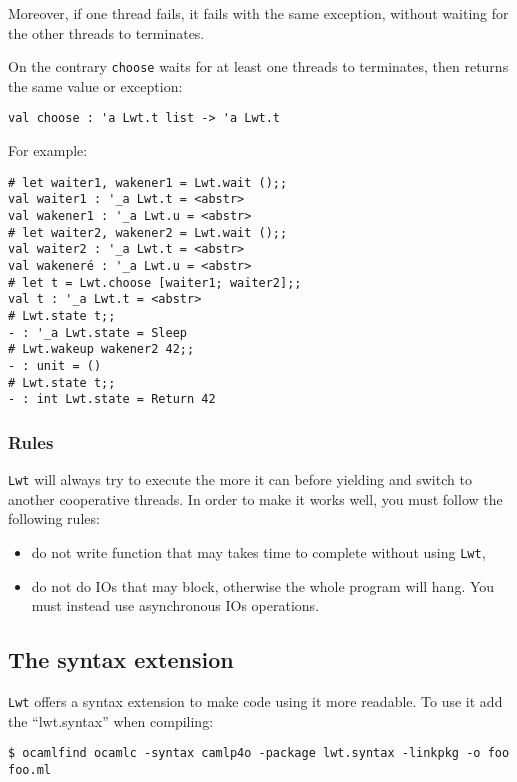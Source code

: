 \documentclass{article}
\newcommand{\lwt}{\texttt{Lwt}\xspace}
\begin{document}
Moreover, if one thread fails, it fails with the same exception,
without waiting for the other threads to terminates.

On the contrary \texttt{choose} waits for at least one threads to
terminates, then returns the same value or exception:

\begin{verbatim}
val choose : 'a Lwt.t list -> 'a Lwt.t
\end{verbatim}

For example:

\begin{verbatim}
# let waiter1, wakener1 = Lwt.wait ();;
val waiter1 : '_a Lwt.t = <abstr>
val wakener1 : '_a Lwt.u = <abstr>
# let waiter2, wakener2 = Lwt.wait ();;
val waiter2 : '_a Lwt.t = <abstr>
val wakeneré : '_a Lwt.u = <abstr>
# let t = Lwt.choose [waiter1; waiter2];;
val t : '_a Lwt.t = <abstr>
# Lwt.state t;;
- : '_a Lwt.state = Sleep
# Lwt.wakeup wakener2 42;;
- : unit = ()
# Lwt.state t;;
- : int Lwt.state = Return 42
\end{verbatim}

\subsubsection{Rules}

\lwt will always try to execute the more it can before yielding and
switch to another cooperative threads. In order to make it works well,
you must follow the following rules:

\begin{itemize}
\item do not write function that may takes time to complete without
  using \lwt,
\item do not do IOs that may block, otherwise the whole program will
  hang. You must instead use asynchronous IOs operations.
\end{itemize}

\subsection{The syntax extension}

\lwt offers a syntax extension to make code using it more readable.
To use it add the ``lwt.syntax'' when compiling:

\begin{verbatim}
$ ocamlfind ocamlc -syntax camlp4o -package lwt.syntax -linkpkg -o foo foo.ml
\end{verbatim}
\end{document}
